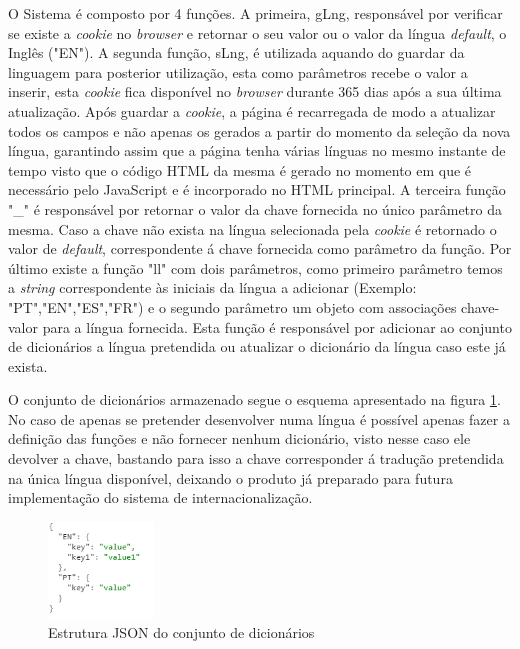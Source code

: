 \par O Sistema é composto por 4 funções. A primeira, gLng, responsável por verificar se existe a \textit{cookie} no \textit{browser} e retornar o seu valor ou o valor da língua \textit{default}, o Inglês ("EN"). A segunda função, sLng, é utilizada aquando do guardar da linguagem para posterior utilização, esta como parâmetros recebe o valor a inserir, esta \textit{cookie} fica disponível no \textit{browser} durante 365 dias após a sua última atualização. Após guardar a \textit{cookie}, a página é recarregada de modo a atualizar todos os campos e não apenas os gerados a partir do momento da seleção da nova língua, garantindo assim que a página tenha várias línguas no mesmo instante de tempo visto que o código HTML da mesma é gerado no momento em que é necessário pelo JavaScript e é incorporado no HTML principal. A terceira função "\_" é responsável por retornar o valor da chave fornecida no único parâmetro da mesma. Caso a chave não exista na língua selecionada pela \textit{cookie} é retornado o valor de \textit{default}, correspondente á chave fornecida como parâmetro da função. Por último existe a função "ll" com dois parâmetros, como primeiro parâmetro temos a \textit{string} correspondente às iniciais da língua a adicionar (Exemplo: "PT","EN","ES","FR") e o segundo parâmetro um objeto com associações chave-valor para a língua fornecida. Esta função é responsável por adicionar ao conjunto de dicionários a língua pretendida ou atualizar o dicionário da língua caso este já exista.
\par O conjunto de dicionários armazenado segue o esquema apresentado na figura \ref{dicextr}. No caso de apenas se pretender desenvolver numa língua é possível apenas fazer a definição das funções e não fornecer nenhum dicionário, visto nesse caso ele devolver a chave, bastando para isso a chave corresponder á tradução pretendida na única língua disponível, deixando o produto já preparado para futura implementação do sistema de internacionalização.



\begin{figure}[ht]
\centering
\includegraphics[width=0.25\textwidth]{images/extrjson.png}
\caption{Estrutura JSON do conjunto de dicionários}\label{dicextr}
\end{figure}

